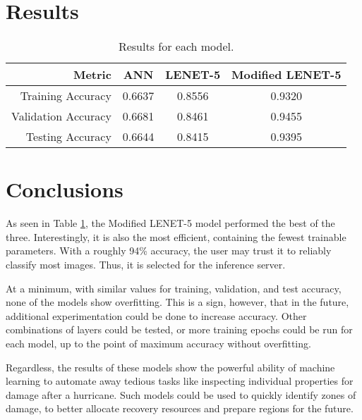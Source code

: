 \documentclass{article}
\begin{document}
\section{Results}

\begin{table}[h!]
	\centering
	\caption{Results for each model.}
	\label{tbl:results}
	\begin{tabular}{r|ccc}
		Metric & ANN & LENET-5 & Modified LENET-5 \\
		\hline
		Training Accuracy & 0.6637 & 0.8556 & 0.9320 \\
		Validation Accuracy & 0.6681 & 0.8461 & 0.9455 \\
		Testing Accuracy & 0.6644 & 0.8415 & 0.9395
	\end{tabular}
\end{table}

\section{Conclusions}

As seen in Table \ref{tbl:results}, the Modified LENET-5 model performed the best of the three. Interestingly, it is also the most efficient, containing the fewest trainable parameters. With a roughly 94\% accuracy, the user may trust it to reliably classify most images. Thus, it is selected for the inference server.

At a minimum, with similar values for training, validation, and test accuracy, none of the models show overfitting. This is a sign, however, that in the future, additional experimentation could be done to increase accuracy. Other combinations of layers could be tested, or more training epochs could be run for each model, up to the point of maximum accuracy without overfitting.

Regardless, the results of these models show the powerful ability of machine learning to automate away tedious tasks like inspecting individual properties for damage after a hurricane. Such models could be used to quickly identify zones of damage, to better allocate recovery resources and prepare regions for the future.
\end{document}
